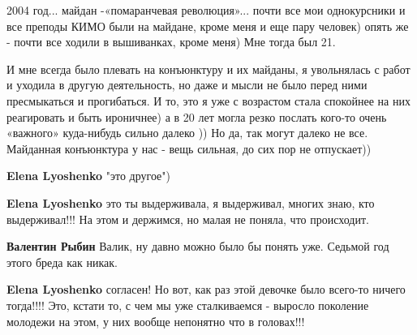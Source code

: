 \begin{itemize}
\begin{itemize}
2004 год... майдан -«помаранчевая революция»... почти все мои однокурсники и все
преподы КИМО были на майдане, кроме меня и еще пару человек) опять же - почти
все ходили в вышиванках, кроме меня) Мне тогда был 21.

И мне всегда было плевать на конъюнктуру и их майданы, я увольнялась с работ и
уходила в другую деятельность, но даже и мысли не было перед ними пресмыкаться
и прогибаться. И то, это я уже с возрастом стала спокойнее на них реагировать и
быть ироничнее) а в 20 лет могла резко послать кого-то очень «важного»
куда-нибудь сильно далеко )) Но да, так могут далеко не все. Майданная
конъюнктура у нас - вещь сильная, до сих пор не отпускает))

 
\textbf{Elena Lyoshenko} "это другое")

 
\textbf{Elena Lyoshenko} это ты выдерживала, я выдерживал, многих знаю, кто
выдерживал!!! На этом и держимся, но малая не поняла, что происходит.

 

\textbf{Валентин Рыбин}
Валик, ну давно можно было бы понять уже. Седьмой год этого бреда как никак.

 
\textbf{Elena Lyoshenko} согласен! Но вот, как раз этой девочке было всего-то
ничего тогда!!!! Это, кстати то, с чем мы уже сталкиваемся - выросло поколение
молодежи на этом, у них вообще непонятно что в головах!!!


\end{itemize}
\end{itemize}

